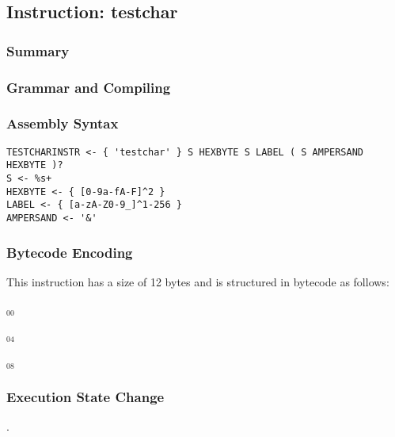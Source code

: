 \subsection{Instruction: testchar}

\subsubsection{Summary}


\subsubsection{Grammar and Compiling}


\subsubsection{Assembly Syntax}

\begin{myquote}
\begin{verbatim}
TESTCHARINSTR <- { 'testchar' } S HEXBYTE S LABEL ( S AMPERSAND HEXBYTE )?
S <- %s+
HEXBYTE <- { [0-9a-fA-F]^2 }
LABEL <- { [a-zA-Z0-9_]^1-256 }
AMPERSAND <- '&'
\end{verbatim}
\end{myquote}

\subsubsection{Bytecode Encoding}

This instruction has a size of 12 bytes and is structured in bytecode as follows:

$_{00}$\ 



$_{04}$\ 



$_{08}$\ 
\fbox{%
  \parbox{20pt}{%
00
  }%
}


\subsubsection{Execution State Change}

.


